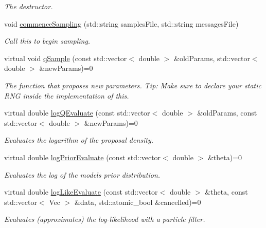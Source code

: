 \begin{DoxyCompactItemize}
\begin{DoxyCompactList}\small\item\em The destructor. \end{DoxyCompactList}\item 
void \hyperlink{classPmmh_ac035560cb209fb5cade23e431b5e1fd3}{commence\+Sampling} (std\+::string samples\+File, std\+::string messages\+File)
\begin{DoxyCompactList}\small\item\em Call this to begin sampling. \end{DoxyCompactList}\item 
virtual void \hyperlink{classPmmh_ab8527fd052ddaa434b8b4ab9715d503f}{q\+Sample} (const std\+::vector$<$ double $>$ \&old\+Params, std\+::vector$<$ double $>$ \&new\+Params)=0
\begin{DoxyCompactList}\small\item\em The function that proposes new parameters. Tip\+: Make sure to declare your static R\+NG inside the implementation of this. \end{DoxyCompactList}\item 
virtual double \hyperlink{classPmmh_a9948772ed9f9e1024302c524641d9915}{log\+Q\+Evaluate} (const std\+::vector$<$ double $>$ \&old\+Params, const std\+::vector$<$ double $>$ \&new\+Params)=0
\begin{DoxyCompactList}\small\item\em Evaluates the logarithm of the proposal density. \end{DoxyCompactList}\item 
virtual double \hyperlink{classPmmh_ada5cc8317bd91ca129909abe0ec2cd1b}{log\+Prior\+Evaluate} (const std\+::vector$<$ double $>$ \&theta)=0
\begin{DoxyCompactList}\small\item\em Evaluates the log of the model\textquotesingle{}s prior distribution. \end{DoxyCompactList}\item 
virtual double \hyperlink{classPmmh_a4a66167bea425f5d271ef7931f4a3e5f}{log\+Like\+Evaluate} (const std\+::vector$<$ double $>$ \&theta, const std\+::vector$<$ Vec $>$ \&data, std\+::atomic\+\_\+bool \&cancelled)=0
\begin{DoxyCompactList}\small\item\em Evaluates (approximates) the log-\/likelihood with a particle filter. \end{DoxyCompactList}\end{DoxyCompactItemize}


